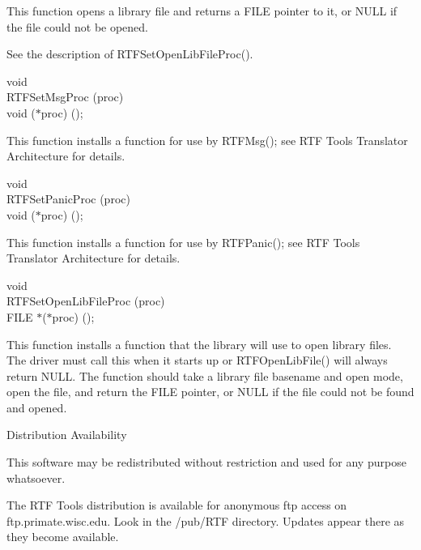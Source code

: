\documentclass{article}
\begin{document}
\noindent
This function opens a library file and returns a FILE pointer to it, or NULL 
if the file could not be opened.



\noindent
See the description of RTFSetOpenLibFileProc().




\noindent
void\\
RTFSetMsgProc (proc)\\
void	($\ast $proc) ();




\noindent
This function installs a function for use by RTFMsg(); see RTF Tools Translator 
Architecture for details.




\noindent
void\\
RTFSetPanicProc (proc)\\
void	($\ast $proc) ();




\noindent
This function installs a function for use by RTFPanic(); see RTF Tools Translator 
Architecture for details.




\noindent
void\\
RTFSetOpenLibFileProc (proc)\\
FILE	$\ast $($\ast $proc) ();




\noindent
This function installs a function that the library will use to open library 
files. The driver must call this when it starts up or RTFOpenLibFile() will 
always return NULL. The function should take a library file basename and 
open mode, open the file, and return the FILE pointer, or NULL if the file 
could not be found and opened.




\noindent
Distribution Availability






\noindent
This software may be redistributed without restriction and used for any purpose 
whatsoever.



\noindent
The RTF Tools distribution is available for anonymous ftp access on ftp.primate.wisc.edu. 
Look in the /pub/RTF directory. Updates appear there as they become available.
\end{document}
